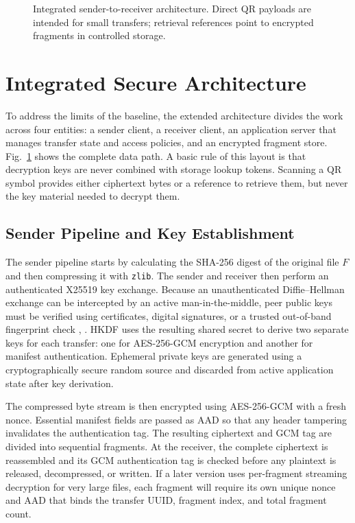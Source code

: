 \documentclass[conference]{IEEEtran}
\begin{document}
\begin{figure}[t]
\caption{Integrated sender-to-receiver architecture. Direct QR payloads are intended for small transfers; retrieval references point to encrypted fragments in controlled storage.}
\label{fig:arch}
\end{figure}

\section{Integrated Secure Architecture}
To address the limits of the baseline, the extended architecture divides the work across four entities: a sender client, a receiver client, an application server that manages transfer state and access policies, and an encrypted fragment store. Fig.~\ref{fig:arch} shows the complete data path. A basic rule of this layout is that decryption keys are never combined with storage lookup tokens. Scanning a QR symbol provides either ciphertext bytes or a reference to retrieve them, but never the key material needed to decrypt them.

\subsection{Sender Pipeline and Key Establishment}
The sender pipeline starts by calculating the SHA-256 digest of the original file $F$ and then compressing it with \texttt{zlib}. The sender and receiver then perform an authenticated X25519 key exchange. Because an unauthenticated Diffie--Hellman exchange can be intercepted by an active man-in-the-middle, peer public keys must be verified using certificates, digital signatures, or a trusted out-of-band fingerprint check \cite{rfc7748}, \cite{rfc5869}. HKDF uses the resulting shared secret to derive two separate keys for each transfer: one for AES-256-GCM encryption and another for manifest authentication. Ephemeral private keys are generated using a cryptographically secure random source and discarded from active application state after key derivation.

The compressed byte stream is then encrypted using AES-256-GCM with a fresh nonce. Essential manifest fields are passed as AAD so that any header tampering invalidates the authentication tag. The resulting ciphertext and GCM tag are divided into sequential fragments. At the receiver, the complete ciphertext is reassembled and its GCM authentication tag is checked before any plaintext is released, decompressed, or written. If a later version uses per-fragment streaming decryption for very large files, each fragment will require its own unique nonce and AAD that binds the transfer UUID, fragment index, and total fragment count.
\end{document}
